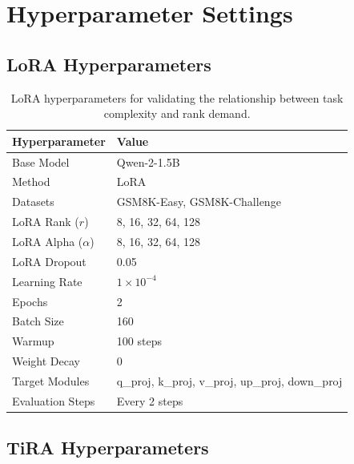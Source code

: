 \documentclass[a4paper,11pt]{article}
\begin{document}
\section{Hyperparameter Settings}

\subsection{LoRA Hyperparameters}
\label{app:lora_hyperparams}

\begin{table}[H]
\centering
\caption{LoRA hyperparameters for validating the relationship between task complexity and rank demand.}
\begin{tabular}{ll}
\toprule
Hyperparameter & Value \\
\midrule
Base Model & Qwen-2-1.5B \\
Method & LoRA \\
Datasets & GSM8K-Easy, GSM8K-Challenge \\
LoRA Rank ($r$) & 8, 16, 32, 64, 128 \\
LoRA Alpha ($\alpha$) & 8, 16, 32, 64, 128 \\
LoRA Dropout & 0.05 \\
Learning Rate & $1\times10^{-4}$ \\
Epochs & 2 \\
Batch Size & 160 \\
Warmup & 100 steps \\
Weight Decay & 0 \\
Target Modules & q\_proj, k\_proj, v\_proj, up\_proj, down\_proj \\
Evaluation Steps & Every 2 steps \\
\bottomrule
\end{tabular}
\end{table}

\subsection{TiRA Hyperparameters}
\label{app:tira_hyperparams}
\end{document}
